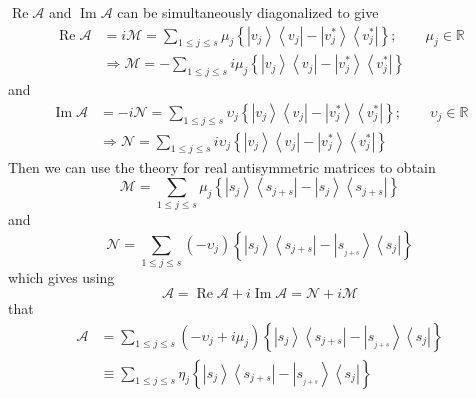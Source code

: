 \documentclass[aps,preprint]{revtex4}%
\begin{document}
$\operatorname{Re}\mathcal{A}$ and $\operatorname{Im}\mathcal{A}$ can be
simultaneously diagonalized to give
\begin{align}
\operatorname{Re}\mathcal{A}  & =i\mathcal{M}=\sum_{1\leq j\leq s}\mu
_{j}\left\{  \left\vert v_{j}\right\rangle \left\langle v_{j}\right\vert
-\left\vert v_{j}^{\ast}\right\rangle \left\langle v_{j}^{\ast}\right\vert
\right\}  ;\qquad\mu_{j}\in\mathbb{R}\nonumber\\
& \Rightarrow\mathcal{M}=\mathcal{-}\sum_{1\leq j\leq s}i\mu_{j}\left\{
\left\vert v_{j}\right\rangle \left\langle v_{j}\right\vert -\left\vert
v_{j}^{\ast}\right\rangle \left\langle v_{j}^{\ast}\right\vert \right\}
\end{align}
and
\begin{align}
\operatorname{Im}\mathcal{A}  & =-i\mathcal{N}=\sum_{1\leq j\leq s}%
\upsilon_{j}\left\{  \left\vert v_{j}\right\rangle \left\langle v_{j}%
\right\vert -\left\vert v_{j}^{\ast}\right\rangle \left\langle v_{j}^{\ast
}\right\vert \right\}  ;\qquad\upsilon_{j}\in\mathbb{R}\nonumber\\
& \Rightarrow\mathcal{N}=\sum_{1\leq j\leq s}i\upsilon_{j}\left\{  \left\vert
v_{j}\right\rangle \left\langle v_{j}\right\vert -\left\vert v_{j}^{\ast
}\right\rangle \left\langle v_{j}^{\ast}\right\vert \right\}
\end{align}
Then we can use the theory for real antisymmetric matrices to obtain
\begin{equation}
\mathcal{M}=\sum_{1\leq j\leq s}\mu_{j}\left\{  \left\vert s_{j}\right\rangle
\left\langle s_{j+s}\right\vert -\left\vert s_{j}\right\rangle \left\langle
s_{j+s}\right\vert \right\}
\end{equation}
and
\begin{equation}
\mathcal{N}=\sum_{1\leq j\leq s}\left(  -\upsilon_{j}\right)  \left\{
\left\vert s_{j}\right\rangle \left\langle s_{j+s}\right\vert -\left\vert
s_{_{j+s}}\right\rangle \left\langle s_{j}\right\vert \right\}
\end{equation}
which gives using
\begin{equation}
\mathcal{A}=\operatorname{Re}\mathcal{A}+i\operatorname{Im}\mathcal{A}%
=\mathcal{N}+i\mathcal{M}%
\end{equation}
that
\begin{align}
\mathcal{A}  & =\sum_{1\leq j\leq s}\left(  -\upsilon_{j}+i\mu_{j}\right)
\left\{  \left\vert s_{j}\right\rangle \left\langle s_{j+s}\right\vert
-\left\vert s_{_{j+s}}\right\rangle \left\langle s_{j}\right\vert \right\}
\nonumber\\
& \equiv\sum_{1\leq j\leq s}\eta_{j}\left\{  \left\vert s_{j}\right\rangle
\left\langle s_{j+s}\right\vert -\left\vert s_{_{j+s}}\right\rangle
\left\langle s_{j}\right\vert \right\}
\end{align}
\end{document}
